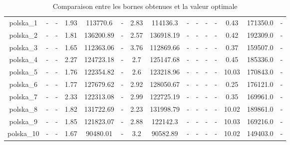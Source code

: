 \documentclass[main.tex]{subfiles}
\begin{document}
\begin{landscape}
\begin{table}[h]
\begin{tabular}{c|cc|ccc|ccc|ccc|ccc}
	polska\_1 &- &- &1.93 &113770.6 &- &2.83 &114136.3 &- &- &- &- &0.43 &171350.0 &-\\
	polska\_2 &- &- &1.81 &136200.89 &- &2.57 &136918.19 &- &- &- &- &0.42 &192309.0 &-\\
	polska\_3 &- &- &1.65 &112363.06 &- &3.76 &112869.66 &- &- &- &- &0.37 &159507.0 &-\\
	polska\_4 &- &- &2.27 &124723.18 &- &2.7 &125147.68 &- &- &- &- &0.45 &185336.0 &-\\
	polska\_5 &- &- &1.76 &122354.82 &- &2.6 &123218.96 &- &- &- &- &10.03 &170843.0 &-\\
	polska\_6 &- &- &1.77 &127679.62 &- &2.92 &128050.67 &- &- &- &- &0.25 &176121.0 &-\\
	polska\_7 &- &- &2.33 &122313.08 &- &2.99 &122725.19 &- &- &- &- &0.35 &169961.0 &-\\
	polska\_8 &- &- &1.82 &131722.69 &- &2.23 &131998.79 &- &- &- &- &10.02 &189861.0 &-\\
	polska\_9 &- &- &1.85 &121823.07 &- &2.88 &122142.3 &- &- &- &- &10.03 &169216.0 &-\\
	polska\_10 &- &- &1.67 &90480.01 &- &3.2 &90582.89 &- &- &- &- &10.02 &149403.0 &-\\
\end{tabular}\caption{Comparaison entre les bornes obtenues et la valeur optimale}
\end{table}
\end{landscape}
\end{document}
